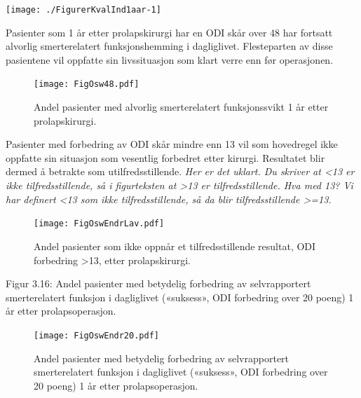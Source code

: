 \documentclass [norsk,a4paper,twoside]{article}\usepackage[]{graphicx}\usepackage[]{color}
\newenvironment{knitrout}{}{} %
\begin{document}
\begin{knitrout}
\color{fgcolor}

{\centering \texttt{[image: ./FigurerKvalInd1aar-1]} 

}



\end{knitrout}


Pasienter som 1 år etter prolapskirurgi har en ODI skår over 48 har fortsatt alvorlig
smerterelatert funksjonshemming i dagliglivet. Flesteparten av disse pasientene vil
oppfatte sin livssituasjon som klart verre enn før operasjonen.
\begin{figure}[ht]
\centering \texttt{[image: FigOsw48.pdf]}
\caption{\label{fig:Osw48}  Andel pasienter med alvorlig smerterelatert funksjonssvikt 1 år etter
prolapskirurgi.}
\end{figure}

\clearpage

Pasienter med forbedring av ODI skår mindre enn 13 vil som hovedregel ikke
oppfatte sin situasjon som vesentlig forbedret etter kirurgi. Resultatet blir dermed å
betrakte som utilfredsstillende. \textit{Her er det uklart. Du skriver at <13 er ikke tilfredsstillende, så i figurteksten at >13 er tilfredsstillende. Hva med 13? Vi har definert <13 som ikke tilfredsstillende, så da blir tilfredsstillende >=13.}

\begin{figure}[ht]
\centering \texttt{[image: FigOswEndrLav.pdf]}
\caption{\label{fig:OswEndrLav}   Andel pasienter som ikke oppnår et tilfredsstillende resultat, ODI
forbedring >13, etter prolapskirurgi.}
\end{figure}



Figur 3.16: Andel pasienter med betydelig forbedring av selvrapportert
smerterelatert funksjon i dagliglivet («suksess», ODI forbedring over 20 poeng) 1 år
etter prolapsoperasjon.
\begin{figure}[ht]
\centering \texttt{[image: FigOswEndr20.pdf]}
\caption{\label{fig:OswEndr20}   Andel pasienter med betydelig forbedring av selvrapportert
smerterelatert funksjon i dagliglivet («suksess», ODI forbedring over 20 poeng) 1 år
etter prolapsoperasjon.}
\end{figure}
\end{document}
